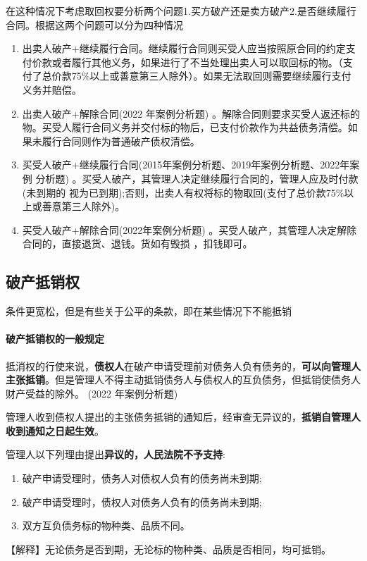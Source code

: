 \documentclass[UTF8,12pt]{ctexart}
\numberwithin{equation}{section} %
\numberwithin{figure}{section}
\numberwithin{table}{section}
\begin{document}
	在这种情况下考虑取回权要分析两个问题1.买方破产还是卖方破产2.是否继续履行合同。根据这两个问题可以分为四种情况
	\begin{enumerate}
		\item 出卖人破产+继续履行合同。继续履行合同则买受人应当按照原合同的约定支付价款或者履行其他义务，如果进行了不当处理出卖人可以取回标的物。（支付了总价款75\%以上或善意第三人除外）。如果无法取回则需要继续履行支付义务并赔偿。
		
		\item 出卖人破产+解除合同(2022 年案例分析题) 。解除合同则要求买受人返还标的物。买受人履行合同义务并交付标的物后，已支付价款作为共益债务清偿。如果未履行合同则作为普通破产债权清偿。
		
		\item 买受人破产+继续履行合同(2015年案例分析题、2019年案例分析题、2022年案例 分析题) 。买受人破产，其管理人决定继续履行合同的，管理人应及时付款 (未到期的 视为已到期);否则，出卖人有权将标的物取回(支付了总价款75\%以上或善意第三人除外)。
		
		\item  买受人破产+解除合同(2022年案例分析题) 。买受人破产，其管理人决定解除合同的，直接退货、退钱。货如有毁损 ，扣钱即可。
	\end{enumerate}


	
	\subsection{破产抵销权}
	条件更宽松，但是有些关于公平的条款，即在某些情况下不能抵销
	
	\paragraph{破产抵销权的一般规定}
	抵消权的行使来说，\textbf{债权人}在破产申请受理前对债务人负有债务的，\textbf{可以向管理人主张抵销}。但是管理人不得主动抵销债务人与债权人的互负债务，但抵销使债务人财产受益的除外。 (2022 年案例分析题)
	
	管理人收到债权人提出的主张债务抵销的通知后，经审查无异议的，\textbf{抵销自管理人收到通知之日起生效}。
	
	管理人以下列理由提出\textbf{异议的，人民法院不予支持}: 
	\begin{enumerate}
		\item 破产申请受理时，债务人对债权人负有的债务尚未到期;
		
		\item 破产申请受理时，债权人对债务人负有的债务尚未到期;
		
		\item 双方互负债务标的物种类、品质不同。
	\end{enumerate}
	【解释】无论债务是否到期，无论标的物种类、品质是否相同，均可抵销。
	
\end{document}
